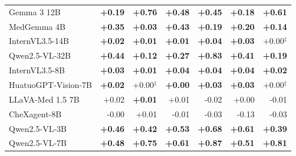 \documentclass{article}
\begin{document}
\begin{table}[htbp]
\begin{tabular}{lrrrrrr}
Gemma 3 12B & \cellcolor{cfTerra3}\textbf{+0.19} & \cellcolor{cfTerra4}\textbf{+0.76} & \cellcolor{cfTerra4}\textbf{+0.48} & \cellcolor{cfTerra4}\textbf{+0.45} & \cellcolor{cfTerra3}\textbf{+0.18} & \cellcolor{cfTerra4}\textbf{+0.61} \\
MedGemma 4B & \cellcolor{cfTerra4}\textbf{+0.35} & \cellcolor{cfTerra2}\textbf{+0.03} & \cellcolor{cfTerra4}\textbf{+0.43} & \cellcolor{cfTerra3}\textbf{+0.19} & \cellcolor{cfTerra3}\textbf{+0.20} & \cellcolor{cfTerra3}\textbf{+0.14} \\
InternVL3.5-14B & \cellcolor{cfTerra1}\textbf{+0.02} & \cellcolor{cfTerra1}\textbf{+0.01} & \cellcolor{cfTerra1}\textbf{+0.01} & \cellcolor{cfTerra2}\textbf{+0.04} & \cellcolor{cfTerra2}\textbf{+0.03} & \cellcolor{cfTerra1}+0.00$^{\ddagger}$ \\
Qwen2.5-VL-32B & \cellcolor{cfTerra4}\textbf{+0.44} & \cellcolor{cfTerra3}\textbf{+0.12} & \cellcolor{cfTerra4}\textbf{+0.27} & \cellcolor{cfTerra4}\textbf{+0.83} & \cellcolor{cfTerra4}\textbf{+0.41} & \cellcolor{cfTerra3}\textbf{+0.19} \\
InternVL3.5-8B & \cellcolor{cfTerra2}\textbf{+0.03} & \cellcolor{cfTerra1}\textbf{+0.01} & \cellcolor{cfTerra2}\textbf{+0.04} & \cellcolor{cfTerra2}\textbf{+0.04} & \cellcolor{cfTerra2}\textbf{+0.04} & \cellcolor{cfTerra1}\textbf{+0.02} \\
HuatuoGPT-Vision-7B & \cellcolor{cfTerra1}\textbf{+0.02} & \cellcolor{cfTerra1}+0.00$^{\ddagger}$ & \cellcolor{cfTerra1}\textbf{+0.00} & \cellcolor{cfTerra2}\textbf{+0.03} & \cellcolor{cfTerra2}\textbf{+0.03} & \cellcolor{cfTerra1}+0.00$^{\ddagger}$ \\
LLaVA-Med 1.5 7B & \cellcolor{cfTerra1}+0.02 & \cellcolor{cfTerra1}\textbf{+0.01} & \cellcolor{cfTerra1}+0.01 & \cellcolor{cfSlate2}-0.02 & \cellcolor{cfTerra1}+0.00 & \cellcolor{cfSlate1}-0.01 \\
CheXagent-8B & \cellcolor{cfSlate1}-0.00 & \cellcolor{cfTerra1}+0.01 & \cellcolor{cfSlate1}-0.01 & \cellcolor{cfSlate2}-0.03 & \cellcolor{cfSlate3}-0.13 & \cellcolor{cfSlate2}-0.03 \\
Qwen2.5-VL-3B & \cellcolor{cfTerra4}\textbf{+0.46} & \cellcolor{cfTerra4}\textbf{+0.42} & \cellcolor{cfTerra4}\textbf{+0.53} & \cellcolor{cfTerra4}\textbf{+0.68} & \cellcolor{cfTerra4}\textbf{+0.61} & \cellcolor{cfTerra4}\textbf{+0.39} \\
Qwen2.5-VL-7B & \cellcolor{cfTerra4}\textbf{+0.48} & \cellcolor{cfTerra4}\textbf{+0.75} & \cellcolor{cfTerra4}\textbf{+0.61} & \cellcolor{cfTerra4}\textbf{+0.87} & \cellcolor{cfTerra4}\textbf{+0.51} & \cellcolor{cfTerra4}\textbf{+0.81} \\

\end{tabular}
\end{table}
\end{document}
